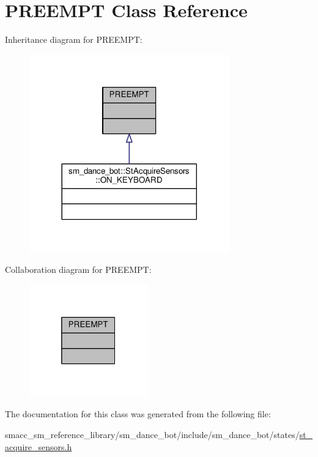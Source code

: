\hypertarget{classPREEMPT}{}\section{P\+R\+E\+E\+M\+PT Class Reference}
\label{classPREEMPT}


Inheritance diagram for P\+R\+E\+E\+M\+PT\+:\nopagebreak
\begin{figure}[H]
\begin{center}
\leavevmode
\includegraphics[width=245pt]{classPREEMPT__inherit__graph}
\end{center}
\end{figure}


Collaboration diagram for P\+R\+E\+E\+M\+PT\+:\nopagebreak
\begin{figure}[H]
\begin{center}
\leavevmode
\includegraphics[width=145pt]{classPREEMPT__coll__graph}
\end{center}
\end{figure}


The documentation for this class was generated from the following file\+:\begin{DoxyCompactItemize}
\item 
smacc\+\_\+sm\+\_\+reference\+\_\+library/sm\+\_\+dance\+\_\+bot/include/sm\+\_\+dance\+\_\+bot/states/\hyperlink{st__acquire__sensors_8h}{st\+\_\+acquire\+\_\+sensors.\+h}\end{DoxyCompactItemize}

